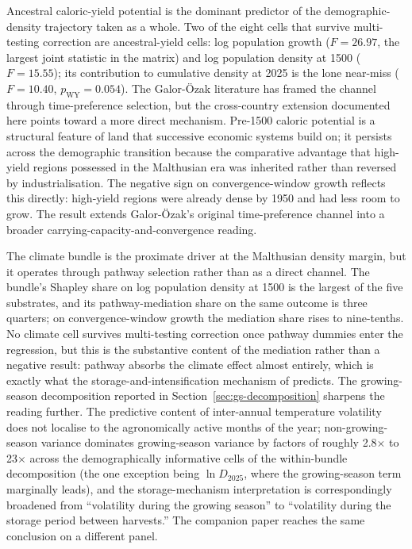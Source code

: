 \documentclass[11pt,letterpaper]{article}
\begin{document}
Ancestral caloric-yield potential is the dominant predictor of the demographic-density trajectory taken as a whole. Two of the eight cells that survive multi-testing correction are ancestral-yield cells: log population growth ($F=26.97$, the largest joint statistic in the matrix) and log population density at 1500 ($F=15.55$); its contribution to cumulative density at 2025 is the lone near-miss ($F=10.40$, $p_{\text{WY}}=0.054$). The Galor-\"Ozak literature has framed the channel through time-preference selection, but the cross-country extension documented here points toward a more direct mechanism. Pre-1500 caloric potential is a structural feature of land that successive economic systems build on; it persists across the demographic transition because the comparative advantage that high-yield regions possessed in the Malthusian era was inherited rather than reversed by industrialisation. The negative sign on convergence-window growth reflects this directly: high-yield regions were already dense by 1950 and had less room to grow. The result extends Galor-\"Ozak's original time-preference channel into a broader carrying-capacity-and-convergence reading.

The climate bundle is the proximate driver at the Malthusian density margin, but it operates through pathway selection rather than as a direct channel. The bundle's Shapley share on log population density at 1500 is the largest of the five substrates, and its pathway-mediation share on the same outcome is three quarters; on convergence-window growth the mediation share rises to nine-tenths. No climate cell survives multi-testing correction once pathway dummies enter the regression, but this is the substantive content of the mediation rather than a negative result: pathway absorbs the climate effect almost entirely, which is exactly what the storage-and-intensification mechanism of \citet{matranga2024} predicts. The growing-season decomposition reported in Section~\ref{sec:gs-decomposition} sharpens the reading further. The predictive content of inter-annual temperature volatility does not localise to the agronomically active months of the year; non-growing-season variance dominates growing-season variance by factors of roughly 2.8$\times$ to 23$\times$ across the demographically informative cells of the within-bundle decomposition (the one exception being $\ln D_{2025}$, where the growing-season term marginally leads), and the storage-mechanism interpretation is correspondingly broadened from ``volatility during the growing season'' to ``volatility during the storage period between harvests.'' The companion paper \citep{alonso_long_shadow} reaches the same conclusion on a different panel.
\end{document}

